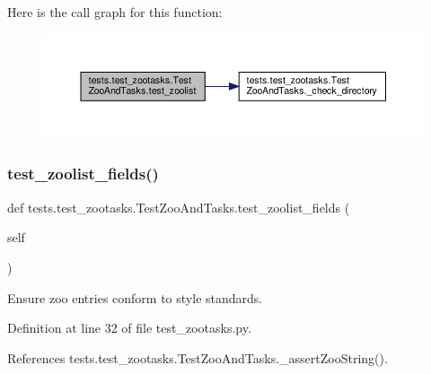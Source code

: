 Here is the call graph for this function\+:
\nopagebreak
\begin{figure}[H]
\begin{center}
\leavevmode
\includegraphics[width=350pt]{classtests_1_1test__zootasks_1_1TestZooAndTasks_a1c1bb2568bc1871c11d14ac136a9e2b3_cgraph}
\end{center}
\end{figure}
\mbox{\label{classtests_1_1test__zootasks_1_1TestZooAndTasks_a57e8f4db75b9eb31263d4e269c40068f}} 
\subsubsection{\texorpdfstring{test\+\_\+zoolist\+\_\+fields()}{test\_zoolist\_fields()}}
{\footnotesize\ttfamily def tests.\+test\+\_\+zootasks.\+Test\+Zoo\+And\+Tasks.\+test\+\_\+zoolist\+\_\+fields (\begin{DoxyParamCaption}\item[{}]{self }\end{DoxyParamCaption})}

\begin{DoxyVerb}Ensure zoo entries conform to style standards.\end{DoxyVerb}
 

Definition at line 32 of file test\+\_\+zootasks.\+py.



References tests.\+test\+\_\+zootasks.\+Test\+Zoo\+And\+Tasks.\+\_\+assert\+Zoo\+String().

